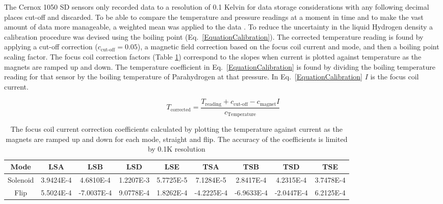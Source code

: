  The Cernox 1050 SD sensors only recorded data to a resolution of 0.1 Kelvin for data storage considerations with any following decimal places cut-off and discarded. To be able to compare the temperature and pressure readings at a moment in time and to make the vast amount of data more manageable, a weighted mean was applied to the data \cite{NOTE524}. To reduce the uncertainty in the liquid Hydrogen density a calibration procedure was devised using the boiling point
 (Eq.~\ref{EquationCalibration}). The corrected temperature reading is found by applying a cut-off correction ($c_\textrm{cut-off} = 0.05$), a magnetic field correction based on the focus coil current and mode, and then a boiling point scaling factor. The focus coil correction factors (Table \ref{tab:magnet}) correspond to the slopes when current is plotted against temperature as the magnets are ramped up and down. The temperature coefficient in Eq.~\ref{EquationCalibration} is found by dividing the boiling
temperature reading for that sensor by the boiling temperature of Parahydrogen at that pressure. In Eq.~\ref{EquationCalibration} $I$ is the focus coil current. 
 
\begin{equation}
T_\textrm{corrected}=\frac{T_\textrm{reading}+c_\textrm{cut-off}-c_\textrm{magnet}I}{c_\textrm{Temperature}}
\label{EquationCalibration}
\end{equation}

\begin{table}
\small
  \caption{
    The focus coil current correction coefficients calculated by plotting the temperature against current as the magnets are ramped up and down for each mode, straight and flip. The accuracy of the coefficients is limited by 0.1K resolution
  }
  \label{tab:magnet}
  \begin{center}
    \begin{tabular}{|c c c c c c c c c|}
    \hline

Mode      & LSA & LSB & LSD & LSE & TSA & TSB & TSD & TSE     \rule{0pt}{14pt} \\
\hline
Solenoid & 3.9424E-4 & 4.6810E-4 & 1.2207E-3 & 5.7725E-5 & 7.1284E-5 & 2.8417E-4 & 4.2315E-4 & 3.7478E-4
\\
Flip & 5.5024E-4 & -7.0037E-4 & 9.0778E-4 & 1.8262E-4 & -4.2225E-4 & -6.9633E-4 & -2.0447E-4 & 6.2125E-4
\\

    \hline
    \end{tabular}
  \end{center}
\end{table} 
 
